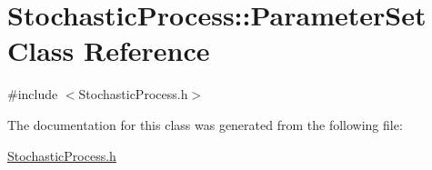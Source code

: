\hypertarget{class_stochastic_process_1_1_parameter_set}{}\section{Stochastic\+Process\+:\+:Parameter\+Set Class Reference}
\label{class_stochastic_process_1_1_parameter_set}


{\ttfamily \#include $<$Stochastic\+Process.\+h$>$}



The documentation for this class was generated from the following file\+:\begin{DoxyCompactItemize}
\item 
\hyperlink{_stochastic_process_8h}{Stochastic\+Process.\+h}\end{DoxyCompactItemize}
